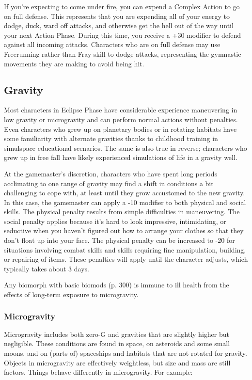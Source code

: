 If you’re expecting to come under fire, you can expend a Complex Action to go on full defense. This represents that you are expending all of your energy to dodge, duck, ward off attacks, and otherwise get the hell out of the way until your next Action Phase. During this time, you receive a +30 modifier to defend against all incoming attacks. Characters who are on full defense may use Freerunning rather than Fray skill to dodge attacks, representing the gymnastic movements they are making to avoid being hit.

\subsection{Gravity}
\label{sec:gravity}

Most characters in Eclipse Phase have considerable experience maneuvering in low gravity or microgravity and can perform normal actions without penalties. Even characters who grew up on planetary bodies or in rotating habitats have some familiarity with alternate gravities thanks to childhood training in simulspace educational scenarios. The same is also true in reverse; characters who grew up in free fall have likely experienced simulations of life in a gravity well.

At the gamemaster’s discretion, characters who have spent long periods acclimating to one range of gravity may find a shift in conditions a bit challenging to cope with, at least until they grow accustomed to the new gravity. In this case, the gamemaster can apply a -10 modifier to both physical and social skills. The physical penalty results from simple difficulties in maneuvering. The social penalty applies because it’s hard to look impressive, intimidating, or seductive when you haven’t figured out how to arrange your clothes so that they don’t float up into your face. The physical penalty can be increased to -20 for situations involving combat skills and skills requiring fine manipulation, building, or repairing of items. These penalties will apply until the character adjusts, which typically takes about 3 days.

Any biomorph with basic biomods (p. 300) is immune to ill health from the effects of long-term exposure to microgravity.

\subsubsection{Microgravity}

Microgravity includes both zero-G and gravities that are slightly higher but negligible. These conditions are found in space, on asteroids and some small moons, and on (parts of) spaceships and habitats that are not rotated for gravity. Objects in microgravity are effectively weightless, but size and mass are still factors. Things behave differently in microgravity. For example:

